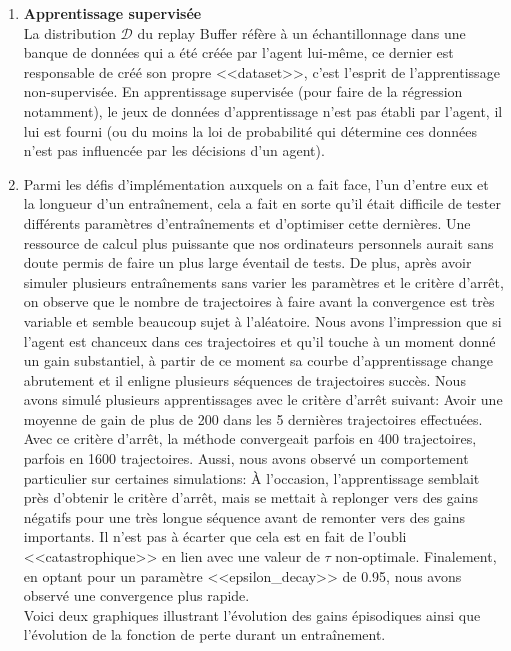 \documentclass[letterpaper,11pt]{article}
\begin{document}
\begin{enumerate}[label=(\alph*)]
\item \textbf{Apprentissage supervisée}\\
La distribution $\mathcal{D}$ du replay Buffer réfère à un échantillonnage dans une banque de données qui a été créée par l'agent lui-même, ce dernier est responsable de créé son propre <<dataset>>, c'est l'esprit de l'apprentissage non-supervisée. En apprentissage supervisée (pour faire de la régression notamment), le jeux de données d'apprentissage n'est pas établi par l'agent, il lui est fourni (ou du moins la loi de probabilité qui détermine ces données n'est pas influencée par les décisions d'un agent).

\item Parmi les défis d'implémentation auxquels on a fait face, l'un d'entre eux et la longueur d'un entraînement, cela a fait en sorte qu'il était difficile de tester différents paramètres d'entraînements et d'optimiser cette dernières. Une ressource de calcul plus puissante que nos ordinateurs personnels aurait sans doute permis de faire un plus large éventail de tests. De plus, après avoir simuler plusieurs entraînements sans varier les paramètres et le critère d'arrêt, on observe que le nombre de trajectoires à faire avant la convergence est très variable et semble beaucoup sujet à l'aléatoire. Nous avons l'impression que si l'agent est chanceux dans ces trajectoires et qu'il touche à un moment donné un gain substantiel, à partir de ce moment sa courbe d'apprentissage change abrutement et il enligne plusieurs séquences de trajectoires succès. Nous avons simulé plusieurs apprentissages avec le critère d'arrêt suivant: Avoir une moyenne de gain de plus de 200 dans les 5 dernières trajectoires effectuées. Avec ce critère d'arrêt, la méthode convergeait parfois en 400 trajectoires, parfois en 1600 trajectoires. Aussi, nous avons observé un comportement particulier sur certaines simulations: À l'occasion, l'apprentissage semblait près d'obtenir le critère d'arrêt, mais se mettait à replonger vers des gains négatifs pour une très longue séquence avant de remonter vers des gains importants. Il n'est pas à écarter que cela est en fait de l'oubli <<catastrophique>> en lien avec une valeur de $\tau$ non-optimale. Finalement, en optant pour un paramètre <<epsilon\_decay>> de 0.95, nous avons observé une convergence plus rapide.\\

Voici deux graphiques illustrant l'évolution des gains épisodiques ainsi que l'évolution de la fonction de perte durant un entraînement.


\end{enumerate}
\end{document}
